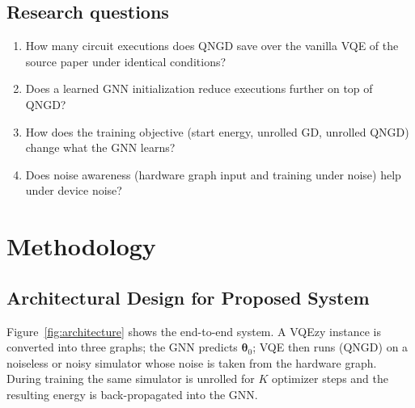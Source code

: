 \documentclass{ssnreview}
\begin{document}
\section{Research questions}
\begin{enumerate}[label=\textbf{RQ\arabic*.}]
  \item How many circuit executions does QNGD save over the vanilla VQE of the source paper under
        identical conditions?
  \item Does a learned GNN initialization reduce executions further on top of QNGD?
  \item How does the training objective (start energy, unrolled GD, unrolled QNGD) change what
        the GNN learns?
  \item Does noise awareness (hardware graph input and training under noise) help under device
        noise?
\end{enumerate}

\chapter{Methodology}

\section{Architectural Design for Proposed System}

Figure~\ref{fig:architecture} shows the end-to-end system. A VQEzy instance is converted into
three graphs; the GNN predicts $\boldsymbol\theta_0$; VQE then runs (QNGD) on a noiseless or
noisy simulator whose noise is taken from the hardware graph. During training the same
simulator is unrolled for $K$ optimizer steps and the resulting energy is back-propagated into
the GNN.
\end{document}
